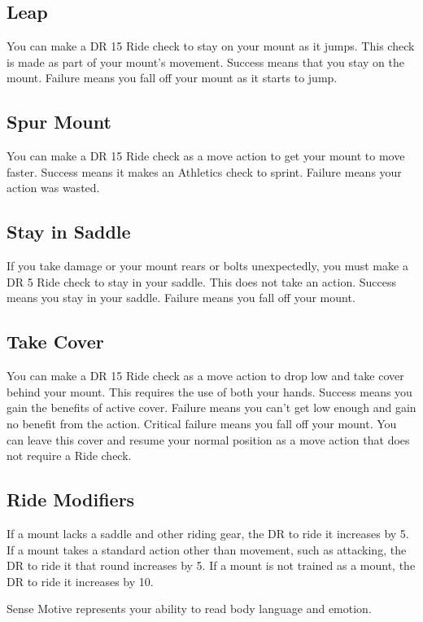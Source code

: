     \subsection{Leap}
        You can make a DR 15 Ride check to stay on your mount as it jumps. This check is made as part of your mount's movement. Success means that you stay on the mount. Failure means you fall off your mount as it starts to jump.

    \subsection{Spur Mount}
        You can make a DR 15 Ride check as a move action to get your mount to move faster. Success means it makes an Athletics check to sprint. Failure means your action was wasted.

    \subsection{Stay in Saddle}
        If you take damage or your mount rears or bolts unexpectedly, you must make a DR 5 Ride check to stay in your saddle. This does not take an action. Success means you stay in your saddle. Failure means you fall off your mount.

    \subsection{Take Cover}
        You can make a DR 15 Ride check as a move action to drop low and take cover behind your mount. This requires the use of both your hands. Success means you gain the benefits of active cover. Failure means you can't get low enough and gain no benefit from the action. Critical failure means you fall off your mount. You can leave this cover and resume your normal position as a move action that does not require a Ride check.

    \subsection{Ride Modifiers}\label{Ride Modifiers}
        If a mount lacks a saddle and other riding gear, the DR to ride it increases by 5. If a mount takes a standard action other than movement, such as attacking, the DR to ride it that round increases by 5. If a mount is not trained as a mount, the DR to ride it increases by 10.

        Sense Motive represents your ability to read body language and emotion.

